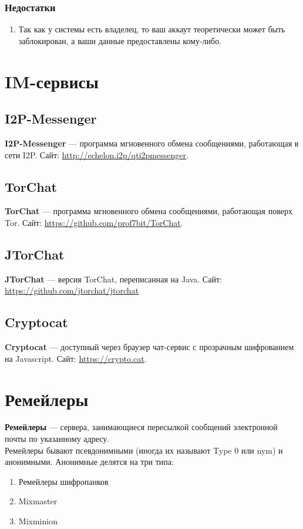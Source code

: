 \subsubsection{Недостатки}
\begin{enumerate}
\item Так как у системы есть владелец, то ваш аккаут теоретически может быть заблокирован, а ваши данные предоставлены кому-либо.
\end{enumerate}

\section{IM-сервисы}
\subsection{I2P-Messenger}
\textbf{I2P-Messenger} --- программа мгновенного обмена сообщениями, работающая в сети I2P. Сайт: \url{http://echelon.i2p/qti2pmessenger}.
\subsection{TorChat}
\textbf{TorChat} --- программа мгновенного обмена сообщениями, работающая поверх Tor. Сайт: \url{https://github.com/prof7bit/TorChat}.
\subsection{JTorChat}
\textbf{JTorChat} --- версия TorChat, переписанная на Java. Сайт: \url{https://github.com/jtorchat/jtorchat}
\subsection{Cryptocat}
\textbf{Cryptocat} --- доступный через браузер чат-сервис с прозрачным шифрованием на Javascript. Сайт: \url{https://crypto.cat}.

\section{Ремейлеры}
\textbf{Ремейлеры} --- сервера, занимающиеся пересылкой сообщений электронной почты по указанному адресу.\\
Ремейлеры бывают псевдонимными (иногда их называют Type 0 или nym) и анонимными. Анонимные делятся на три типа:
\begin{enumerate}
\item Ремейлеры шифропанков
\item Mixmaster 
\item Mixminion
\end{enumerate}
